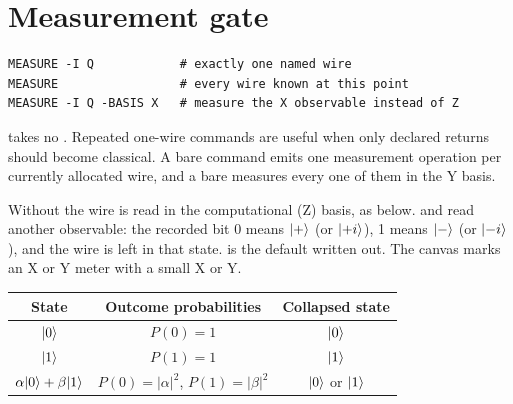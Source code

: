 \section{Measurement gate}
\hypertarget{measure-collapse}{}


\begin{lstlisting}
MEASURE -I Q            # exactly one named wire
MEASURE                 # every wire known at this point
MEASURE -I Q -BASIS X   # measure the X observable instead of Z
\end{lstlisting}
 takes no . Repeated one-wire commands are useful when
only declared returns should become classical. A bare command emits one
measurement operation per currently allocated wire, and a bare
 measures every one of them in the Y basis.

Without  the wire is read in the computational (Z) basis, as
below.  and  read another observable: the
recorded bit 0 means $\lvert +\rangle$ (or $\lvert +i\rangle$), 1 means $\lvert -\rangle$ (or
$\lvert -i\rangle$), and the wire is left in that state.  is the
default written out. The canvas marks an X or Y meter with a small X or Y.

\begin{center}
\begin{tabular}{c|c|c}\toprule State & Outcome probabilities & Collapsed state\\\midrule
$\lvert 0\rangle$ & $P(0)=1$ & $\lvert 0\rangle$\\
$\lvert 1\rangle$ & $P(1)=1$ & $\lvert 1\rangle$\\
$\alpha\lvert 0\rangle+\beta\lvert 1\rangle$ & $P(0)=|\alpha|^2$, $P(1)=|\beta|^2$ &
$\lvert 0\rangle$ or $\lvert 1\rangle$\\\bottomrule
\end{tabular}
\end{center}

